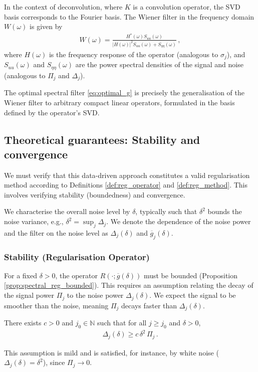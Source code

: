 In the context of deconvolution, where $K$ is a convolution operator, the SVD basis corresponds to the Fourier basis. The Wiener filter in the frequency domain $W(\omega)$ is given by
\begin{align*}
W(\omega) = \frac{H^*(\omega) S_{uu}(\omega)}{|H(\omega)|^2 S_{uu}(\omega) + S_{\eta\eta}(\omega)} \, ,
\end{align*}
where $H(\omega)$ is the frequency response of the operator (analogous to $\sigma_j$), and $S_{uu}(\omega)$ and $S_{\eta\eta}(\omega)$ are the power spectral densities of the signal and noise (analogous to $\Pi_j$ and $\Delta_j$).

The optimal spectral filter \eqref{eq:optimal_g} is precisely the generalisation of the Wiener filter to arbitrary compact linear operators, formulated in the basis defined by the operator's SVD.

\subsection{Theoretical guarantees: Stability and convergence}

We must verify that this data-driven approach constitutes a valid regularisation method according to Definitions \ref{def:reg_operator} and \ref{def:reg_method}. This involves verifying stability (boundedness) and convergence.

We characterise the overall noise level by $\delta$, typically such that $\delta^2$ bounds the noise variance, e.g., $\delta^2 = \sup_j \Delta_j$. We denote the dependence of the noise power and the filter on the noise level as $\Delta_j(\delta)$ and $\overline{g}_j(\delta)$.

\subsubsection{Stability (Regularisation Operator)}

For a fixed $\delta > 0$, the operator $R(\cdot; \overline{g}(\delta))$ must be bounded (Proposition \ref{prop:spectral_reg_bounded}). This requires an assumption relating the decay of the signal power $\Pi_j$ to the noise power $\Delta_j(\delta)$. We expect the signal to be smoother than the noise, meaning $\Pi_j$ decays faster than $\Delta_j(\delta)$.

\begin{assumption}\label{ass:snr_decay}\normalfont
There exists $c > 0$ and $j_0 \in \mathbb{N}$ such that for all $j \geq j_0$ and $\delta > 0$,
\begin{align*}
\Delta_j(\delta) \geq c \, \delta^2 \, \Pi_j \, .
\end{align*}
\end{assumption}
This assumption is mild and is satisfied, for instance, by white noise ($\Delta_j(\delta) = \delta^2$), since $\Pi_j \to 0$.

